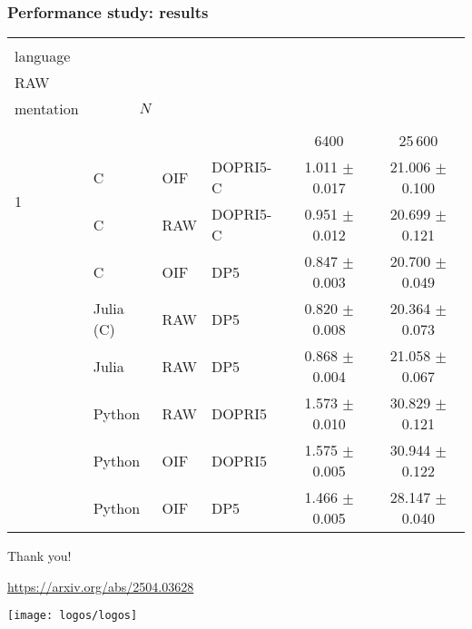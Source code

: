 \documentclass[10pt, aspectratio=169, progressbar=frametitle]{beamer}
\newcommand{\headerWithBreaks}[2]{{%
\multirow{2}{*}{%
  \begin{minipage}[t]{#1}{#2}\end{minipage}
}
}}
\begin{document}
\begin{frame}
  \frametitle{Performance study: results}

\newcommand{\myheader}{%
\headerWithBreaks{0.2em}{\#} &
\headerWithBreaks{3em}{User\\language} &
\headerWithBreaks{1.5em}{OIF/\\RAW} &
\headerWithBreaks{3em}{Imple-\\mentation} &
                                \multicolumn{2}{c}{$N$} \\
                                \cmidrule(lr){5-6}
}
  \vspace{1em}
  \centering
  \begin{tabular}{l l l l c c}
    \toprule
    \myheader                                                                                    \\
                       &           &     &          & 6400                & 25\,600              \\
    \midrule
    \multirow{2}{*}{1} & C         & OIF & DOPRI5-C & 1.011 \(\pm\) 0.017 & 21.006 \(\pm\) 0.100 \\
                       & C         & RAW & DOPRI5-C & 0.951 \(\pm\) 0.012 & 20.699 \(\pm\) 0.121 \\
    \addlinespace
    \addlinespace
    \multirow{3}{*}{2} & C         & OIF & DP5      & 0.847 \(\pm\) 0.003 & 20.700 \(\pm\) 0.049 \\
                       & Julia (C) & RAW & DP5      & 0.820 \(\pm\) 0.008 & 20.364 \(\pm\) 0.073 \\
                       & Julia     & RAW & DP5      & 0.868 \(\pm\) 0.004 & 21.058 \(\pm\) 0.067 \\
    \addlinespace
    \addlinespace
    \multirow{3}{*}{3} & Python    & RAW & DOPRI5   & 1.573 \(\pm\) 0.010 & 30.829 \(\pm\) 0.121 \\
                       & Python    & OIF & DOPRI5   & 1.575 \(\pm\) 0.005 & 30.944 \(\pm\) 0.122 \\
                       & Python    & OIF & DP5      & 1.466 \(\pm\) 0.005 & 28.147 \(\pm\) 0.040 \\
    \bottomrule
  \end{tabular}
\end{frame}

% 

\begin{frame}[standout]
  \centering
  \vspace{9em}
  \huge{Thank you!}

  {\Large \url{https://arxiv.org/abs/2504.03628}}

  \vspace{1em}
  \texttt{[image: logos/logos]}
\end{frame}
\end{document}
